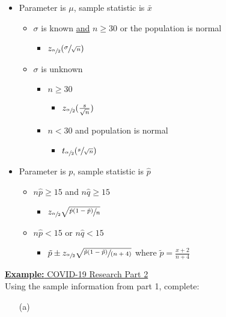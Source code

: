 \documentclass[a4paper]{article}
\let\bf\textbf
\begin{document}
\begin{itemize}
    \item Parameter is $\mu$, sample statistic is $\bar{x}$
    \begin{itemize}
        \item $\sigma$ is known \underline{and} $n\geq 30$ or the population is normal
        \begin{itemize}
            \item $z_{\sfrac{\alpha}{2}}(\sfrac{\sigma}{\sqrt{n}})$
        \end{itemize}
        \item $\sigma$ is unknown
        \begin{itemize}
            \item $n\geq30$
            \begin{itemize}
                \item $z_{\sfrac{\alpha}{2}}(\frac{s}{\sqrt{n}})$
            \end{itemize}
            \item $n<30$ and population is normal
            \begin{itemize}
                \item $t_{\sfrac{\alpha}{2}}(\sfrac{s}{\sqrt{n}})$
            \end{itemize}
        \end{itemize}
    \end{itemize}
    \item Parameter is $p$, sample statistic is $\hat{p}$
    \begin{itemize}
        \item $n\hat{p}\geq15$ and $n\hat{q}\geq15$
        \begin{itemize}
            \item $z_{\sfrac{\alpha}{2}}\sqrt{\sfrac{\hat{p}(1-\hat{p})}{n}}$
        \end{itemize}
        \item $n\hat{p} < 15$ or $n\hat{q} < 15$
        \begin{itemize}
            \item $\tilde{p} \pm z_{\sfrac{\alpha}{2}}\sqrt{\sfrac{\tilde{p}(1-\tilde{p})}{(n+4)}}$ where $\tilde{p} = \frac{x+2}{n+4}$
        \end{itemize}
    \end{itemize}
\end{itemize}
\begin{shaded}
    \underline{\bf{Example:} COVID-19 Research Part 2}
    \vspace{2mm}\\
    Using the sample information from part 1, complete:
    \begin{enumerate}
        \item[(a)] 
    \end{enumerate}
\end{shaded} 
\end{document}

